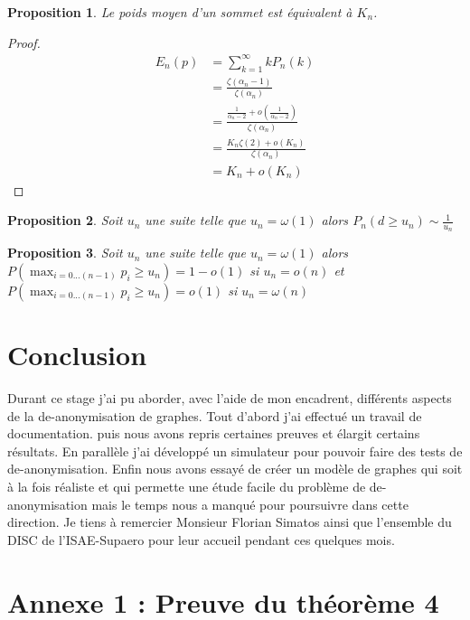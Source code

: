 \documentclass[letterpaper,10pt]{llncs}
\newtheorem{prop}{Proposition}
\begin{document}
\begin{prop}
Le poids moyen d'un sommet est équivalent à $K_n$.
\end{prop}

\begin{proof} 
\[\begin{aligned}
  E_n(p) &= \sum_{k=1}^{\infty} k  P_n(k) \\
  &= \frac{\zeta(\alpha_n - 1)}{\zeta(\alpha_n)} \\
  &= \frac{\frac{1}{\alpha_n - 2} + o(\frac{1}{\alpha_n - 2})}{\zeta(\alpha_n)} \\
  &= \frac{K_n \zeta(2) + o(K_n)}{\zeta(\alpha_n)} \\
  &= K_n + o (K_n)
\end{aligned}\]
\end{proof}

\begin{prop}
Soit $u_n$ une suite telle que $u_n = \omega(1)$ alors $P_n(d\geq u_n) \sim \frac{1}{u_n}$
\end{prop}

\begin{prop}
Soit $u_n$ une suite telle que $u_n = \omega(1)$ alors $P(\max_{i=0 ... (n-1)} p_i \geq u_n) = 1-o(1)$ si $u_n = o(n)$ et $P(\max_{i=0 ... (n-1)} p_i \geq u_n) = o(1)$ si $u_n = \omega(n)$
\end{prop}

\section*{Conclusion}

Durant ce stage j'ai pu aborder, avec l'aide de mon encadrent, différents aspects de la de-anonymisation de graphes. Tout d'abord j'ai effectué un travail de documentation. puis nous avons repris certaines preuves et élargit certains résultats. En parallèle j'ai développé un simulateur pour pouvoir faire des tests de de-anonymisation. Enfin nous avons essayé de créer un modèle de graphes qui soit à la fois réaliste et qui permette une étude facile du problème de de-anonymisation mais le temps nous a manqué pour poursuivre dans cette direction. Je tiens à remercier Monsieur Florian Simatos ainsi que l'ensemble du DISC de l'ISAE-Supaero pour leur accueil pendant ces quelques mois.

\newpage

\section*{Annexe 1 : Preuve du théorème 4}
\end{document}
